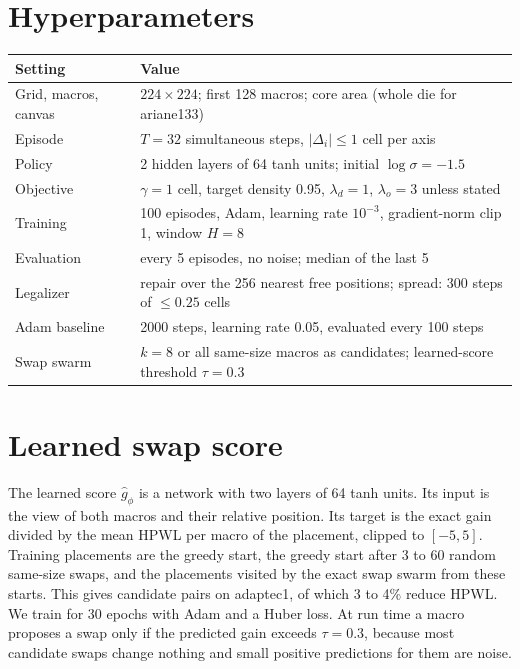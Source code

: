 \documentclass[10pt]{article}
\begin{document}
\clearpage
\appendix
\section{Hyperparameters}\label{app:hyper}
\begin{table}[h]
\centering
\small
\begin{tabular}{@{}ll@{}}
\toprule
Setting & Value \\
\midrule
Grid, macros, canvas & $224\times224$; first 128 macros; core area (whole die for ariane133) \\
Episode & $T=32$ simultaneous steps, $|\Delta_i|\le1$ cell per axis \\
Policy & 2 hidden layers of 64 tanh units; initial $\log\sigma=-1.5$ \\
Objective & $\gamma=1$ cell, target density 0.95, $\lambda_d=1$, $\lambda_o=3$ unless stated \\
Training & 100 episodes, Adam, learning rate $10^{-3}$, gradient-norm clip 1, window $H=8$ \\
Evaluation & every 5 episodes, no noise; median of the last 5 \\
Legalizer & repair over the 256 nearest free positions; spread: 300 steps of $\le0.25$ cells \\
Adam baseline & 2000 steps, learning rate 0.05, evaluated every 100 steps \\
Swap swarm & $k=8$ or all same-size macros as candidates; learned-score threshold $\tau=0.3$ \\
\bottomrule
\end{tabular}
\end{table}

\section{Learned swap score}\label{app:judge}
The learned score $\hat g_\phi$ is a network with two layers of 64 tanh units. Its input is the view of both macros and their relative position. Its target is the exact gain divided by the mean HPWL per macro of the placement, clipped to $[-5,5]$. Training placements are the greedy start, the greedy start after 3 to 60 random same-size swaps, and the placements visited by the exact swap swarm from these starts. This gives \nScorerSamples{} candidate pairs on adaptec1, of which 3 to 4\% reduce HPWL. We train for 30 epochs with Adam and a Huber loss. At run time a macro proposes a swap only if the predicted gain exceeds $\tau=0.3$, because most candidate swaps change nothing and small positive predictions for them are noise.
\end{document}
